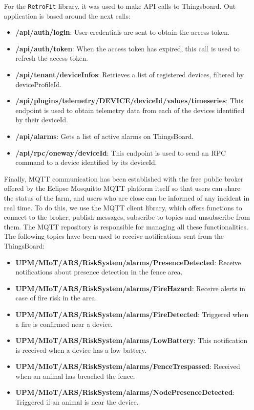 For the \texttt{RetroFit} library, it was used to make API calls to Thingsboard. Out application is based around the next calls:
\begin{itemize}
    \item \textbf{/api/auth/login}: User credentials are sent to obtain the access token.
    \item \textbf{/api/auth/token}: When the access token has expired, this call is used to refresh the access token.
    \item \textbf{/api/tenant/deviceInfos}: Retrieves a list of registered devices, filtered by deviceProfileId. 
    \item \textbf{/api/plugins/telemetry/DEVICE/{deviceId}/values/timeseries}: This endpoint is used to obtain telemetry data from each of the devices identified by their deviceId.
    \item \textbf{/api/alarms}: Gets a list of active alarms on ThingsBoard. 
    \item \textbf{/api/rpc/oneway/{deviceId}}: This endpoint is used to send an RPC command to a device identified by its deviceId.
\end{itemize}

\clearpage
Finally, MQTT communication has been established with the free public broker offered by the Eclipse Mosquitto MQTT platform itself so that users can share the status of the farm, 
and users who are close can be informed of any incident in real time.
To do this, we use the MQTT client library, which offers functions to connect to the broker, publish messages, subscribe to topics and unsubscribe from them.
The MQTT repository is responsible for managing all these functionalities. The following topics have been used to receive notifications sent from the ThingsBoard:

\begin{itemize}
    \item \textbf{UPM/MIoT/ARS/RiskSystem/alarms/PresenceDetected}: Receive notifications about presence detection in the fence area.
    \item \textbf{UPM/MIoT/ARS/RiskSystem/alarms/FireHazard}: Receive alerts in case of fire risk in the area.
    \item \textbf{UPM/MIoT/ARS/RiskSystem/alarms/FireDetected}: Triggered when a fire is confirmed near a device.
    \item \textbf{UPM/MIoT/ARS/RiskSystem/alarms/LowBattery}: This notification is received when a device has a low battery.
    \item \textbf{UPM/MIoT/ARS/RiskSystem/alarms/FenceTrespassed}: Received when an animal has breached the fence.
    \item \textbf{UPM/MIoT/ARS/RiskSystem/alarms/NodePresenceDetected}: Triggered if an animal is near the device.
\end{itemize}
\clearpage
